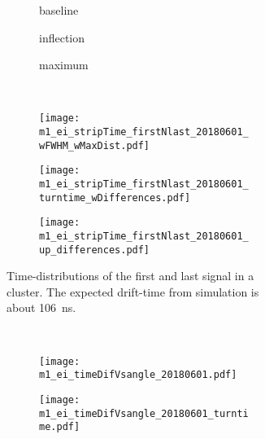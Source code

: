 \documentclass[
twoside,            %
BCOR1.4cm,          %
10pt,               %
headings=normal,    %
headsepline,        %
clearplainpage,		%
final,              %
div=14,
open=right,
bibliography=toc
]{scrreprt}
\begin{document}
\begin{figure}[!h]
	\begin{subfigure}[b]{\textwidth}
		\begin{subfigure}[b]{0.32\textwidth}
			\centering
			baseline
		\end{subfigure}
		\hfill
		\begin{subfigure}[b]{0.32\textwidth}
			\centering
			inflection
		\end{subfigure}
		\hfill
		\begin{subfigure}[b]{0.32\textwidth}
			\centering
			maximum
		\end{subfigure}
	\end{subfigure}
	\vspace{2mm}
	\\
	\begin{subfigure}[b]{\textwidth}
		\begin{subfigure}[b]{0.32\textwidth}
			\centering
			\texttt{[image: m1\_ei\_stripTime\_firstNlast\_20180601\_wFWHM\_wMaxDist.pdf]}
		\end{subfigure}
		\hfill
		\begin{subfigure}[b]{0.32\textwidth}
			\centering
			\texttt{[image: m1\_ei\_stripTime\_firstNlast\_20180601\_turntime\_wDifferences.pdf]}
		\end{subfigure}
		\hfill
		\begin{subfigure}[b]{0.32\textwidth}
			\centering
			\texttt{[image: m1\_ei\_stripTime\_firstNlast\_20180601\_up\_differences.pdf]}
		\end{subfigure}
		\caption{
			Time-distributions of the first and last signal in a cluster.
			The expected drift-time from simulation is about \SI{106}{ns}.
		}
		\label{firstNlastDistributions}
	\end{subfigure}
	\vspace{2mm}
	\\
	\begin{subfigure}[b]{\textwidth}
		\begin{subfigure}[b]{0.32\textwidth}
			\centering
			\texttt{[image: m1\_ei\_timeDifVsangle\_20180601.pdf]}
		\end{subfigure}
		\hfill
		\begin{subfigure}[b]{0.32\textwidth}
			\centering
			\texttt{[image: m1\_ei\_timeDifVsangle\_20180601\_turntime.pdf]}
		\end{subfigure}
		\hfill
		\begin{subfigure}[b]{0.32\textwidth}

\end{subfigure}
\end{subfigure}
\end{figure}
\end{document}
